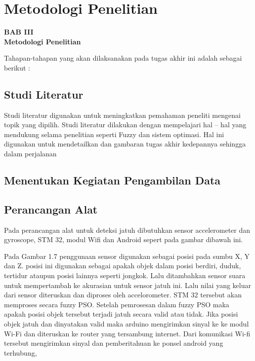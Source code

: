 \documentclass[11pt]{article}
\begin{document}


\newpage

\setcounter{figure}{0}

\section{Metodologi Penelitian}

\begin{center}
	{\large \textbf{BAB III}} \\
	{\large \textbf{Metodologi Penelitian}}
\end{center}

Tahapan-tahapan yang akan dilaksanakan pada tugas akhir ini adalah sebagai berikut :
\subsection{Studi Literatur}

Studi literatur digunakan untuk meningkatkan pemahaman peneliti mengenai topik yang dipilih. Studi literatur dilakukan dengan mempelajari hal – hal yang mendukung selama penelitian seperti Fuzzy dan sistem optimasi. Hal ini digunakan untuk mendetailkan dan gambaran tugas akhir kedepannya  sehingga dalam perjalanan

\subsection{Menentukan Kegiatan Pengambilan Data}

\subsection{Perancangan Alat}
Pada perancangan alat untuk deteksi jatuh dibutuhkan sensor accelerometer dan gyroscope,
STM 32, modul Wifi dan Android sepert pada gambar dibawah ini.


Pada Gambar 1.7 penggunaan sensor digunakan sebagai posisi pada sumbu X, Y dan Z.
posisi ini digunakan sebagai apakah objek dalam posisi berdiri, duduk, tertidur ataupun posisi lainnya seperti jongkok.
Lalu ditambahkan sensor suara untuk mempertambah ke akurasian untuk sensor jatuh ini.
Lalu nilai yang keluar dari sensor diteruskan dan diproses oleh accelorometer.
STM 32 tersebut akan memproses secara fuzzy PSO.
Setelah pemrosesan dalam fuzzy PSO maka apakah posisi objek tersebut terjadi jatuh secara valid atau tidak. Jika posisi objek jatuh dan dinyatakan valid maka arduino mengirimkan sinyal ke ke modul Wi-Fi dan diteruskan ke router yang tersambung internet. 
Dari komunikasi Wi-fi tersebut mengirimkan sinyal dan pemberitahuan ke ponsel android yang terhubung,
\end{document}

